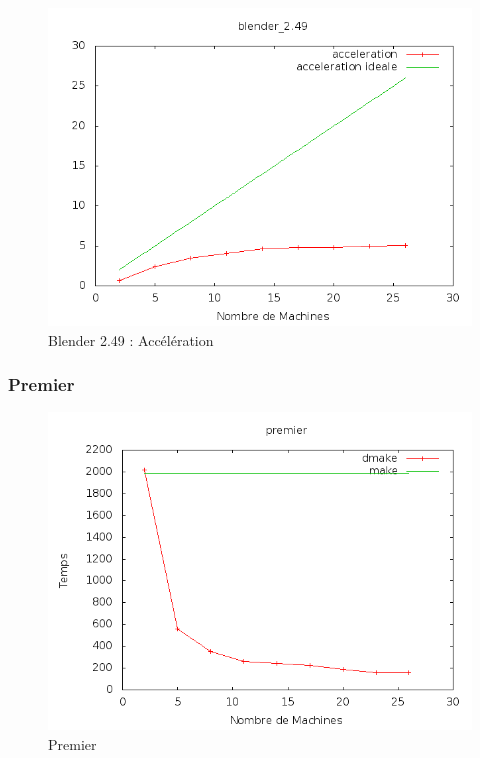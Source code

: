 \documentclass[a4paper,12pt,twoside]{article}
\begin{document}
\begin{figure}[h]
  \centering
  \includegraphics[scale=0.5]{acceleration_blender_2_49.png}
  \caption{Blender 2.49 : Accélération}
  \label{fig:blender249acc}
\end{figure}


\subsubsection{Premier}


\begin{figure}[h]
  \centering
  \includegraphics[scale=0.5]{graph_premier.png}
  \caption{Premier}
  \label{fig:premier}
\end{figure}
\end{document}
